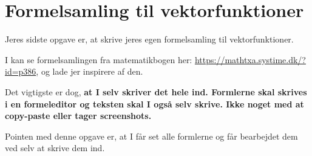 \documentclass[a4paper, 12pt]{article}
\begin{document}
\newpage

\section*{Formelsamling til vektorfunktioner}
\label{sec:orgcc1bfb0}

Jeres sidste opgave er, at skrive jeres egen formelsamling til vektorfunktioner.

I kan se formelsamlingen fra matematikbogen her: \url{https://mathtxa.systime.dk/?id=p386}, og lade jer inspirere af den.

Det vigtigste er dog, \textbf{at I selv skriver det hele ind. Formlerne skal skrives i en formeleditor og teksten skal I også selv skrive. Ikke noget med at copy-paste eller tager screenshots.}

Pointen med denne opgave er, at I får set alle formlerne og får bearbejdet dem ved selv at skrive dem ind.
\end{document}
